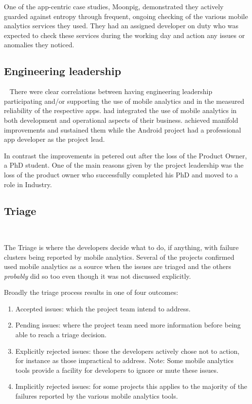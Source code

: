 One of the app-centric case studies, Moonpig, demonstrated they actively guarded against entropy through frequent, ongoing checking of the various mobile analytics services they used. They had an assigned developer on duty who was expected to check these services during the working day and action any issues or anomalies they noticed.

\subsection{Engineering leadership}~\label{aiu-engineering-leadership-topic}
There were clear correlations between having engineering leadership participating and/or supporting the use of mobile analytics and in the measured reliability of the respective apps.  had integrated the use of mobile analytics in both development and operational aspects of their business.  achieved manifold improvements and sustained them while the Android project had a professional app developer as the project lead. 

In contrast the improvements in  petered out after the loss of the Product Owner, a PhD student. One of the main reasons given by the project leadership was the loss of the product owner who successfully completed his PhD and moved to a role in Industry. 


\subsection{Triage}~\label{aiu-triage-theme}

The Triage is where the developers decide what to do, if anything, with failure clusters being reported by mobile analytics. Several of the projects confirmed used mobile analytics as a source when the issues are triaged and the others \textit{probably} did so too even though it was not discussed explicitly.

Broadly the triage process results in one of four outcomes:
\begin{enumerate}
    \item Accepted issues: which the project team intend to address.
    \item Pending issues: where the project team need more information before being able to reach a triage decision.
    \item Explicitly rejected issues: those the developers actively chose not to action, for instance as those impractical to address. Note: Some mobile analytics tools provide a facility for developers to ignore or mute these issues.
    \item Implicitly rejected issues: for some projects this applies to the majority of the failures reported by the various mobile analytics tools.
\end{enumerate}

